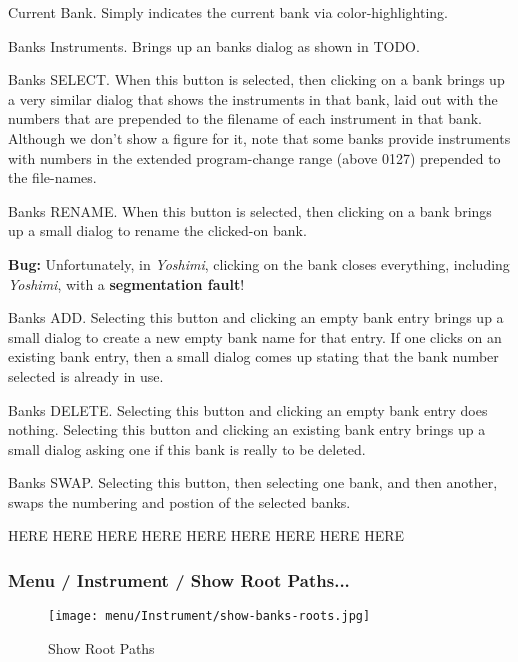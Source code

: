    Current Bank.  Simply indicates the current bank via color-highlighting.

   Banks Instruments.
   Brings up an banks dialog as shown in
   TODO.

   Banks SELECT.
   When this button is selected, then clicking on a bank brings
   up a very similar dialog that shows the instruments in that bank, laid
   out with the numbers that are prepended to the filename of each
   instrument in that bank.
   Although we don't show a figure for it, note that some banks provide
   instruments with numbers in the extended program-change range (above
   0127) prepended to the file-names.

   Banks RENAME.
   When this button is selected, then clicking on a bank brings
   up a small dialog to rename the clicked-on bank.

   \textbf{Bug:}
   Unfortunately, in \textsl{Yoshimi}, clicking on the bank closes
   everything, including \textsl{Yoshimi}, with a
   \textbf{segmentation fault}!

   Banks ADD.
   Selecting this button and clicking an empty bank entry brings up a small
   dialog to create a new empty bank name for that entry.
   If one clicks on an existing bank entry, then a small dialog comes up
   stating that the bank number selected is already in use.

   Banks DELETE.
   Selecting this button and clicking an empty bank entry does nothing.
   Selecting this button and clicking an existing bank entry brings up a
   small dialog asking one if this bank is really to be deleted.

   Banks SWAP.
   Selecting this button, then selecting one bank, and then another,
   swaps the numbering and postion of the selected banks.

   HERE HERE HERE
   HERE HERE HERE
   HERE HERE HERE

\subsubsection{Menu / Instrument / Show Root Paths...}
\label{subsubsec:menu_instrument_show_root_paths}

\begin{figure}[H]
   \centering 
   \texttt{[image: menu/Instrument/show-banks-roots.jpg]}
   \caption[Show Root Paths]{Show Root Paths}
   \label{fig:show_banks_roots}
\end{figure}

